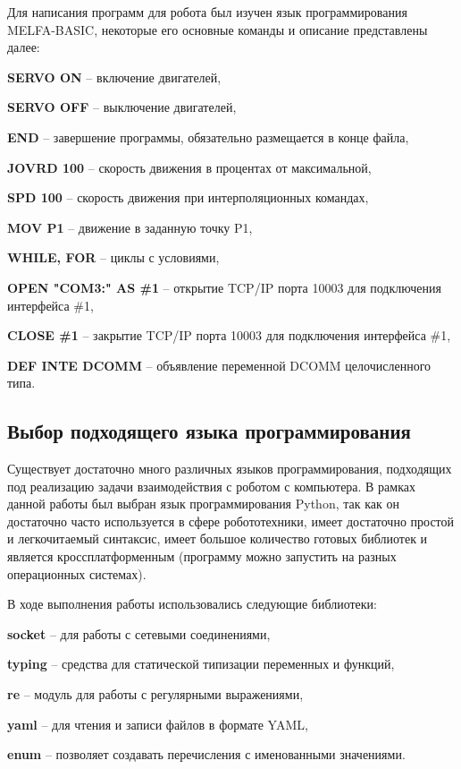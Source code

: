 \documentclass[a4paper,14pt]{extarticle}
\begin{document}
Для написания программ для робота был изучен язык программирования
MELFA-BASIC, некоторые его основные команды и описание представлены
далее:
\begin{compactitem}
    \item \textbf{SERVO ON} -- включение двигателей,
    \item \textbf{SERVO OFF} -- выключение двигателей,
    \item \textbf{END} -- завершение программы, обязательно размещается в конце файла,
    \item \textbf{JOVRD 100} -- скорость движения в процентах от максимальной,
    \item \textbf{SPD 100} -- скорость движения при интерполяционных командах,
    \item \textbf{MOV P1} -- движение в заданную точку P1,
    \item \textbf{WHILE, FOR} -- циклы с условиями,
    \item \textbf{OPEN "COM3:" AS \#1} -- открытие TCP/IP порта 10003 для подключения интерфейса \#1,
    \item \textbf{CLOSE \#1} -- закрытие TCP/IP порта 10003 для подключения интерфейса \#1,
    \item \textbf{DEF INTE DCOMM} -- объявление переменной DCOMM целочисленного типа.
\end{compactitem}


\subsection{Выбор подходящего языка программирования}
Существует достаточно много различных языков программирования,
подходящих под реализацию задачи взаимодействия с роботом с
компьютера. В рамках данной работы был выбран язык
программирования Python, так как он достаточно часто
используется в сфере робототехники, имеет достаточно простой
и легкочитаемый синтаксис,
имеет большое количество готовых библиотек и является кроссплатформенным
(программу можно запустить на разных операционных системах).


В ходе выполнения работы использовались следующие библиотеки:
\begin{compactitem}
    \item \textbf{socket} -- для работы с сетевыми соединениями,
    \item \textbf{typing} -- средства для статической типизации переменных и функций,
    \item \textbf{re} -- модуль для работы с регулярными выражениями,
    \item \textbf{yaml} -- для чтения и записи файлов в формате YAML,
    \item \textbf{enum} -- позволяет создавать перечисления с именованными значениями.
\end{compactitem}
\end{document}
